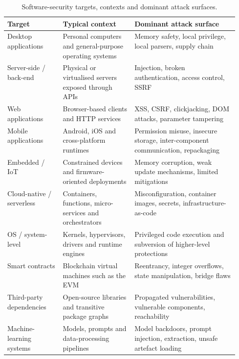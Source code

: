 \begin{table}[htbp]
\centering
\small
\renewcommand{\arraystretch}{1.18}
\begin{tabularx}{\linewidth}{@{}p{0.24\linewidth}p{0.31\linewidth}X@{}}
\toprule
\textbf{Target} & \textbf{Typical context} & \textbf{Dominant attack surface} \\
\midrule
Desktop applications & Personal computers and general-purpose operating systems & Memory safety, local privilege, local parsers, supply chain \\
Server-side / back-end & Physical or virtualised servers exposed through APIs & Injection, broken authentication, access control, SSRF \\
Web applications & Browser-based clients and HTTP services & XSS, CSRF, clickjacking, DOM attacks, parameter tampering \\
Mobile applications & Android, iOS and cross-platform runtimes & Permission misuse, insecure storage, inter-component communication, repackaging \\
Embedded / IoT & Constrained devices and firmware-oriented deployments & Memory corruption, weak update mechanisms, limited mitigations \\
Cloud-native / serverless & Containers, functions, micro-services and orchestrators & Misconfiguration, container images, secrets, infrastructure-as-code \\
OS / system-level & Kernels, hypervisors, drivers and runtime engines & Privileged code execution and subversion of higher-level protections \\
Smart contracts & Blockchain virtual machines such as the EVM & Reentrancy, integer overflows, state manipulation, bridge flaws \\
Third-party dependencies & Open-source libraries and transitive package graphs & Propagated vulnerabilities, vulnerable components, reachability \\
Machine-learning systems & Models, prompts and data-processing pipelines & Model backdoors, prompt injection, extraction, unsafe artefact loading \\
\bottomrule
\end{tabularx}
\caption{Software-security targets, contexts and dominant attack surfaces.}
\label{tab:sec-targets}
\end{table}

